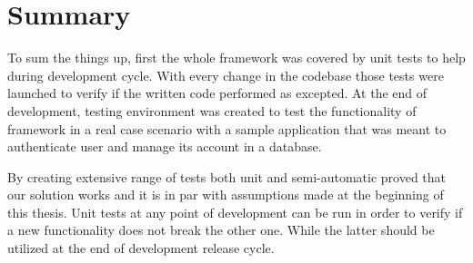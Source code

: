 \section{Summary}
To sum the things up, first the whole framework was covered by unit tests to
help during development cycle. With every change in the codebase those tests
were launched to verify if the written code performed as excepted. At the end
of development, testing environment was created to test the functionality of
framework in a real case scenario with a sample application that was meant to
authenticate user and manage its account in a database.

By creating extensive range of tests both unit and semi-automatic proved that
our solution works and it is in par with assumptions made at the beginning of
this thesis. Unit tests at any point of development can be run in order to
verify if a new functionality does not break the other one. While the latter
should be utilized at the end of development release cycle.
